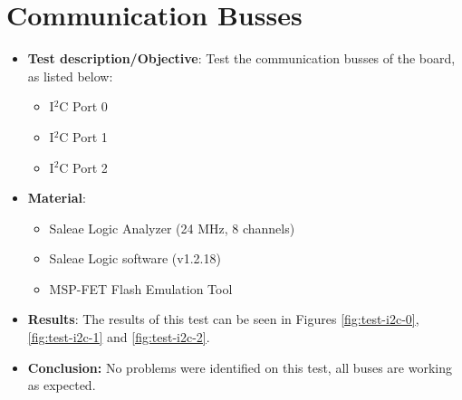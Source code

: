 \section{Communication Busses}

\begin{itemize}
    \item \textbf{Test description/Objective}: Test the communication busses of the board, as listed below:
        \begin{itemize}
            \item I$^{2}$C Port 0
            \item I$^{2}$C Port 1
            \item I$^{2}$C Port 2
        \end{itemize}
    \item \textbf{Material}:
        \begin{itemize}
            \item Saleae Logic Analyzer (24 MHz, 8 channels)
            \item Saleae Logic software (v1.2.18)
            \item MSP-FET Flash Emulation Tool
        \end{itemize}
    \item \textbf{Results}: The results of this test can be seen in Figures \ref{fig:test-i2c-0}, \ref{fig:test-i2c-1} and \ref{fig:test-i2c-2}.
    \item \textbf{Conclusion:} No problems were identified on this test, all buses are working as expected.
\end{itemize}

